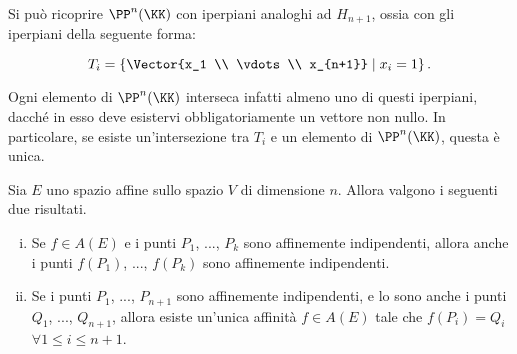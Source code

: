 \documentclass[11pt]{article}
\begin{document}
	\begin{remark}
		Si può ricoprire $\PP^n(\KK)$ con iperpiani analoghi ad $H_{n+1}$, ossia con gli iperpiani della
		seguente forma:
		
		\[ T_i = \left\{ \Vector{x_1 \\ \vdots \\ x_{n+1}} \;\middle\vert\; x_i = 1 \right\}. \]
		
		\vskip 0.1in
		
		Ogni elemento di $\PP^n(\KK)$ interseca infatti almeno uno di questi iperpiani, dacché in esso deve
		esistervi obbligatoriamente un vettore non nullo. In particolare, se esiste un'intersezione tra $T_i$
		e un elemento di $\PP^n(\KK)$, questa è unica.  
	\end{remark}

	\hr
	
	\begin{theorem}
		Sia $E$ uno spazio affine sullo spazio $V$ di dimensione $n$. Allora
		valgono i seguenti due risultati.
		
		\begin{enumerate}[(i)]
			\item Se $f \in A(E)$ e i punti $P_1$, ..., $P_k$ sono affinemente
			indipendenti, allora anche i punti $f(P_1)$, ..., $f(P_k)$ sono
			affinemente indipendenti.
			
			\item Se i punti $P_1$, ..., $P_{n+1}$ sono affinemente indipendenti, e lo sono anche i punti $Q_1$, ..., $Q_{n+1}$,
			allora esiste un'unica affinità
			$f \in A(E)$ tale che $f(P_i) = Q_i$ $\forall 1 \leq i \leq n+1$. 
		\end{enumerate}
	\end{theorem}
\end{document}
